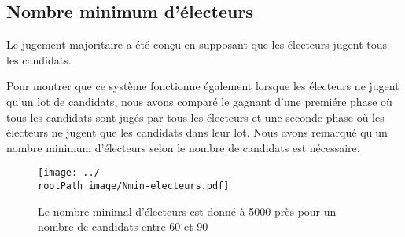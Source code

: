 \documentclass[conference]{IEEEtran}
\newcommand*{\rootPath}{../}
\begin{document}
\subsection{Nombre minimum d'\'electeurs}

Le jugement majoritaire a \'et\'e con\c{c}u en supposant que les \'electeurs jugent tous les candidats. 

Pour montrer que ce syst\`eme fonctionne \'egalement lorsque les \'electeurs ne jugent qu'un lot de candidats, nous avons compar\'e le gagnant d'une premi\'ere phase o\`u tous les candidats sont jug\'es par tous les \'electeurs et une seconde phase o\`u les \'electeurs ne jugent que les candidats dans leur lot. Nous avons remarqu\'e qu'un nombre minimum d'\'electeurs selon le nombre de candidats est n\'ecessaire.

\begin{figure}[!ht]
  \centering
  \texttt{[image: ../\\rootPath image/Nmin-electeurs.pdf]}
  \caption{Le nombre minimal d'\'electeurs est donn\'e \`a 5000 pr\`es pour un nombre de candidats entre 60 et 90}
  \label{fig:rem}
\end{figure}
\end{document}
